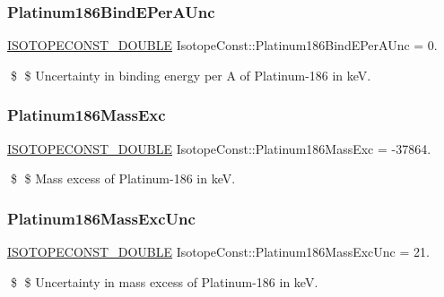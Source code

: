 \subsubsection{\texorpdfstring{Platinum186\+Bind\+E\+Per\+A\+Unc}{Platinum186BindEPerAUnc}}
{\footnotesize\ttfamily \mbox{\hyperlink{group___isotope_const-_macros_ga8f45a7272ce02c0b4c65c44636ed719a}{I\+S\+O\+T\+O\+P\+E\+C\+O\+N\+S\+T\+\_\+\+D\+O\+U\+B\+LE}} Isotope\+Const\+::\+Platinum186\+Bind\+E\+Per\+A\+Unc = 0.}

\$ \$ Uncertainty in binding energy per A of Platinum-\/186 in keV. \mbox{\label{group___isotope_const-_platinum-_pt186_ga0f1ff8989df855a3de21a63bb32865ed}} 
\subsubsection{\texorpdfstring{Platinum186\+Mass\+Exc}{Platinum186MassExc}}
{\footnotesize\ttfamily \mbox{\hyperlink{group___isotope_const-_macros_ga8f45a7272ce02c0b4c65c44636ed719a}{I\+S\+O\+T\+O\+P\+E\+C\+O\+N\+S\+T\+\_\+\+D\+O\+U\+B\+LE}} Isotope\+Const\+::\+Platinum186\+Mass\+Exc = -\/37864.}

\$ \$ Mass excess of Platinum-\/186 in keV. \mbox{\label{group___isotope_const-_platinum-_pt186_gae32e64ddffc525b4e724ac89f3064cbb}} 
\subsubsection{\texorpdfstring{Platinum186\+Mass\+Exc\+Unc}{Platinum186MassExcUnc}}
{\footnotesize\ttfamily \mbox{\hyperlink{group___isotope_const-_macros_ga8f45a7272ce02c0b4c65c44636ed719a}{I\+S\+O\+T\+O\+P\+E\+C\+O\+N\+S\+T\+\_\+\+D\+O\+U\+B\+LE}} Isotope\+Const\+::\+Platinum186\+Mass\+Exc\+Unc = 21.}

\$ \$ Uncertainty in mass excess of Platinum-\/186 in keV. \mbox{\label{group___isotope_const-_platinum-_pt186_gac2a6771d9c5a1fe94c99924d7aef4a3f}} 
